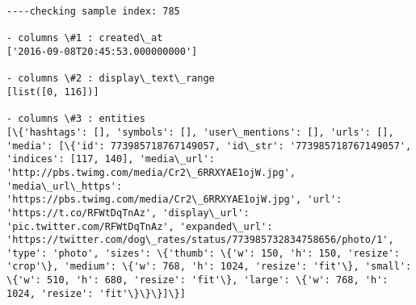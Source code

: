 \documentclass[11pt]{article}
\begin{document}
    \begin{Verbatim}[commandchars=\\\{\}]
----checking sample index: 785

- columns \#1 : created\_at
['2016-09-08T20:45:53.000000000']

- columns \#2 : display\_text\_range
[list([0, 116])]

- columns \#3 : entities
[\{'hashtags': [], 'symbols': [], 'user\_mentions': [], 'urls': [], 'media': [\{'id': 773985718767149057, 'id\_str': '773985718767149057', 'indices': [117, 140], 'media\_url': 'http://pbs.twimg.com/media/Cr2\_6RRXYAE1ojW.jpg', 'media\_url\_https': 'https://pbs.twimg.com/media/Cr2\_6RRXYAE1ojW.jpg', 'url': 'https://t.co/RFWtDqTnAz', 'display\_url': 'pic.twitter.com/RFWtDqTnAz', 'expanded\_url': 'https://twitter.com/dog\_rates/status/773985732834758656/photo/1', 'type': 'photo', 'sizes': \{'thumb': \{'w': 150, 'h': 150, 'resize': 'crop'\}, 'medium': \{'w': 768, 'h': 1024, 'resize': 'fit'\}, 'small': \{'w': 510, 'h': 680, 'resize': 'fit'\}, 'large': \{'w': 768, 'h': 1024, 'resize': 'fit'\}\}\}]\}]


\end{Verbatim}
\end{document}
